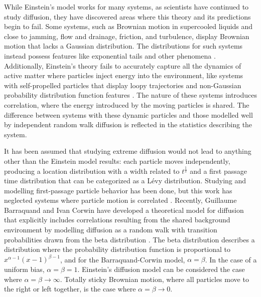 While Einstein's model works for many systems, as scientists have continued to study diffusion, they have discovered areas where this theory and its predictions begin to fail. Some systems, such as Brownian motion in supercooled liquids and close to jamming, flow and drainage, friction, and turbulence, display Brownian motion that lacks a Gaussian distribution\cite{wang_when_2012}. The distributions for such systems instead possess features like exponential tails and other phenomena \cite{metzler_brownian_2019, wang_when_2012}. Additionally, Einstein’s theory fails to accurately capture all the dynamics of active matter where particles inject energy into the environment, like systems with self-propelled particles that display loopy trajectories and non-Gaussian probability distribution function features \cite{kanazawa_loopy_2020, ramaswamy_mechanics_2010}. The nature of these systems introduces correlation, where the energy introduced by the moving particles is shared. The difference between systems with these dynamic particles and those modelled well by independent random walk diffusion is reflected in the statistics describing the system.

It has been assumed that studying extreme diffusion would not lead to anything other than the Einstein model results: each particle moves independently, producing a location distribution with a width related to $t^{\frac{1}{2}}$ and a first passage time distribution that can be categorized as a Lévy distribution. Studying and modelling first-passage particle behavior has been done, but this work has neglected systems where particle motion is correlated \cite{grebenkov_exact_2020}. Recently, Guillaume Barraquand and Ivan Corwin have developed a theoretical model for diffusion that explicitly includes correlations resulting from the shared background environment by modelling diffusion as a random walk with transition probabilities drawn from the beta distribution \cite{barraquand_random-walk_2017}. The beta distribution describes a distribution where the probability distribution function is proportional to $x^{\alpha-1}\left(x-1\right)^{\beta-1}$, and for the Barraquand-Corwin model, $\alpha = \beta$. In the case of a uniform bias, $\alpha = \beta = 1$. Einstein's diffusion model can be considered the case where $\alpha = \beta \rightarrow \infty$. Totally sticky Brownian motion, where all particles move to the right or left together, is the case where $\alpha = \beta \rightarrow 0$.

